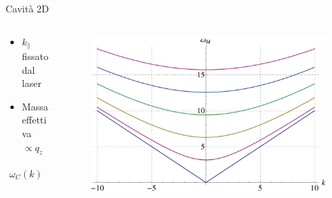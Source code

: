 
\begin{frame}{Cavità 2D}

\begin{figure}

 \end{figure}
 \vskip-10pt
    \begin{columns}
     \begin{column}{.4\textwidth}
      \begin{itemize}
       \item $k_\parallel$ fissato dal laser
       \item Massa effettiva $\propto q_z$ 
      \end{itemize}
      \begin{align*}
        \omega_C(k) &= \frac{c}{n_0}\sqrt{{q_z}^2 + k^2} \\
        \end{align*}
     \end{column}

     \begin{column}{.6\textwidth}
     
      \begin{figure}
       
       \includegraphics[width=.9\columnwidth]{pics/Photon_dispersion_2.pdf}
      \end{figure}

     \end{column}


    \end{columns}


        
\end{frame}

